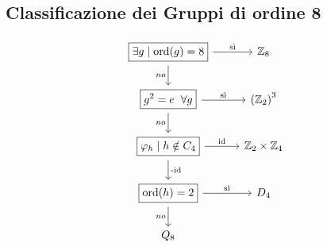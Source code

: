 \documentclass[a4paper]{article}
\theoremstyle{remark}
\theoremstyle{definition}
\begin{document}
\subsection{Classificazione dei Gruppi di ordine 8}
\[ \begin{tikzcd}
\boxed{\exists g \mid \text{ord}(g) = 8} \arrow{r}{\text{sì}} \arrow[swap]{d}{no} & \mathbb{Z}_8 \\
\boxed{g^2 = e \;\;\forall g \arrow{r}{\text{sì}}} \arrow[swap]{d}{no} & \left(\mathbb{Z}_2\right)^3 \\
\boxed{\varphi_h \mid h \notin C_4 \arrow{d}{\text{-id}}} \arrow{r}{\text{id}} & \mathbb{Z}_2 \times \mathbb{Z}_4  \\
\boxed{\text{ord}(h) = 2} \arrow{r}{\text{sì}} \arrow{d}[swap]{no}  & D_4 \\
Q_8
\end{tikzcd}
\]
\end{document}
